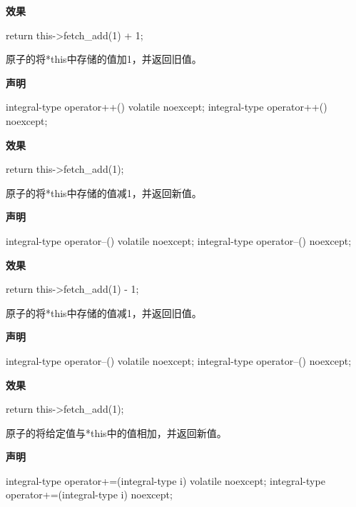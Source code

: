 \textbf{效果}

\begin{cpp}
return this->fetch_add(1) + 1;
\end{cpp}


原子的将*this中存储的值加1，并返回旧值。

\textbf{声明}

\begin{cpp}
integral-type operator++() volatile noexcept;
integral-type operator++() noexcept;
\end{cpp}

\textbf{效果}

\begin{cpp}
return this->fetch_add(1);
\end{cpp}


原子的将*this中存储的值减1，并返回新值。

\textbf{声明}

\begin{cpp}
integral-type operator--() volatile noexcept;
integral-type operator--() noexcept;
\end{cpp}

\textbf{效果}

\begin{cpp}
return this->fetch_add(1) - 1;
\end{cpp}


原子的将*this中存储的值减1，并返回旧值。

\textbf{声明}

\begin{cpp}
integral-type operator--() volatile noexcept;
integral-type operator--() noexcept;
\end{cpp}

\textbf{效果}

\begin{cpp}
return this->fetch_add(1);
\end{cpp}


原子的将给定值与*this中的值相加，并返回新值。

\textbf{声明}

\begin{cpp}
integral-type operator+=(integral-type i) volatile noexcept;
integral-type operator+=(integral-type i) noexcept;
\end{cpp}

